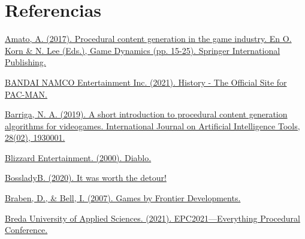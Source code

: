 \section{Referencias}

\begin{thebibliography}{1}


	
	\href{https://doi.org/10.1007/978-3-319-53088-8_2}{Amato, A. (2017). Procedural content generation in the game industry. En O. Korn \& N. Lee (Eds.), Game Dynamics (pp. 15-25). Springer International Publishing.}


	
	\href{https://pacman.com/en/history/}{BANDAI NAMCO Entertainment Inc. (2021). History - The Official Site for PAC-MAN.}
	
	
	\href{https://doi.org/10.1142/S0218213019300011}{Barriga, N. A. (2019). A short introduction to procedural content generation algorithms for videogames. International Journal on Artificial Intelligence Tools, 28(02), 1930001.}
	
	
	\href{https://web.archive.org/web/20000815065620/http://www.blizzard.com/diablo/}{Blizzard Entertainment. (2000). Diablo.}
	
	
	\href{https://www.reddit.com/r/EliteDangerousPics/comments/ezqji1/it_was_worth_the_detour/}{BossladyB. (2020). It was worth the detour!}
	
	
	\href{https://web.archive.org/web/20100127094607/http://frontier.co.uk/games/elite}{Braben, D., \& Bell, I. (2007). Games by Frontier Developments.}
	
	
	\href{http://everythingprocedural.com/}{Breda University of Applied Sciences. (2021). EPC2021—Everything Procedural Conference.}
	
	
	

\end{thebibliography}
